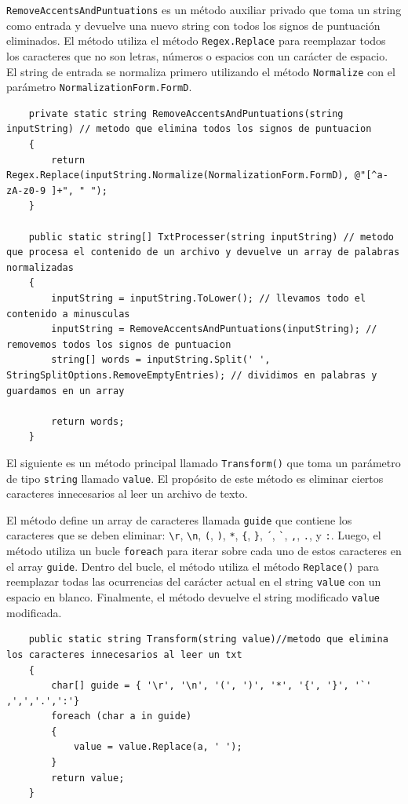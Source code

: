 \documentclass[12pt,a4paper]{report}
\begin{document}
\texttt{RemoveAccentsAndPuntuations} es un método auxiliar privado que toma un string como entrada y devuelve una nuevo string con todos los signos de puntuación eliminados. El método utiliza el método \texttt{Regex.Replace} para reemplazar todos los caracteres que no son letras, números o espacios con un carácter de espacio. El string de entrada se normaliza primero utilizando el método \texttt{Normalize} con el parámetro \texttt{NormalizationForm.FormD}.

\begin{lstlisting}
    private static string RemoveAccentsAndPuntuations(string inputString) // metodo que elimina todos los signos de puntuacion
    {
        return Regex.Replace(inputString.Normalize(NormalizationForm.FormD), @"[^a-zA-z0-9 ]+", " "); 
    }

    public static string[] TxtProcesser(string inputString) // metodo que procesa el contenido de un archivo y devuelve un array de palabras normalizadas
    {
        inputString = inputString.ToLower(); // llevamos todo el contenido a minusculas
        inputString = RemoveAccentsAndPuntuations(inputString); // removemos todos los signos de puntuacion
        string[] words = inputString.Split(' ', StringSplitOptions.RemoveEmptyEntries); // dividimos en palabras y guardamos en un array

        return words;
    }

\end{lstlisting}\bigskip

El siguiente es un método principal llamado \texttt{Transform()} que toma un parámetro de tipo \texttt{string} llamado \texttt{value}. El propósito de este método es eliminar ciertos caracteres innecesarios al leer un archivo de texto. 

El método define un array de caracteres llamada \texttt{guide} que contiene los caracteres que se deben eliminar: \texttt{\textbackslash r}, \texttt{\textbackslash n}, \texttt{(}, \texttt{)}, \texttt{*}, \texttt{\{}, \texttt{\}}, \texttt{´}, \texttt{\`}, \texttt{,}, \texttt{.}, y \texttt{:}. Luego, el método utiliza un bucle \texttt{foreach} para iterar sobre cada uno de estos caracteres en el array \texttt{guide}. Dentro del bucle, el método utiliza el método \texttt{Replace()} para reemplazar todas las ocurrencias del carácter actual en el string \texttt{value} con un espacio en blanco. Finalmente, el método devuelve el string modificado \texttt{value} modificada.

\begin{lstlisting}
    public static string Transform(string value)//metodo que elimina los caracteres innecesarios al leer un txt
    {
        char[] guide = { '\r', '\n', '(', ')', '*', '{', '}', '`' ,',','.',':'}
        foreach (char a in guide)
        {
            value = value.Replace(a, ' ');
        }
        return value;
    }
\end{lstlisting}
\end{document}
